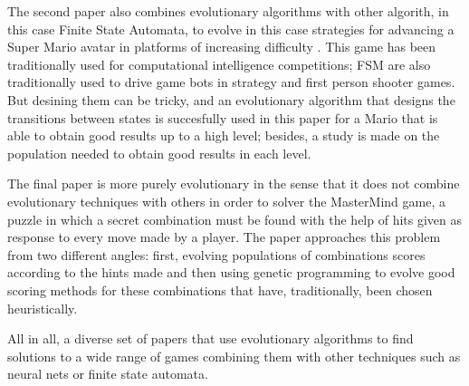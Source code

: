 \documentclass[smallextended]{svjour3}
\begin{document}
The second paper also combines evolutionary algorithms with other
algorith, in this case Finite State Automata, to evolve in this case
strategies for advancing a Super Mario avatar in platforms of
increasing difficulty \cite{evin:mario}. This game has been
traditionally used for computational intelligence competitions; FSM
are also traditionally used to drive game bots in strategy and first
person shooter games. But desining them can be tricky, and an
evolutionary algorithm that designs the transitions between states is
succesfully used in this paper for a Mario that is able to obtain good
results up to a high level; besides, a study is made on the population
needed to obtain good results in each level. 

The final paper is more purely evolutionary \cite{evin:mm} in the
sense that it does not combine evolutionary techniques with others in
order to solver the MasterMind game, a puzzle in which a secret
combination must be found with the help of hits given as response to
every move made by a player. The paper approaches this problem from
two different angles: first, evolving populations of combinations
scores according to the hints made and then using genetic programming
to evolve good scoring methods for these combinations that have,
traditionally, been chosen heuristically.

All in all, a diverse set of papers that use evolutionary algorithms
to find solutions to a wide range of games combining them with other
techniques such as neural nets or finite state automata. 


 

\end{document}
